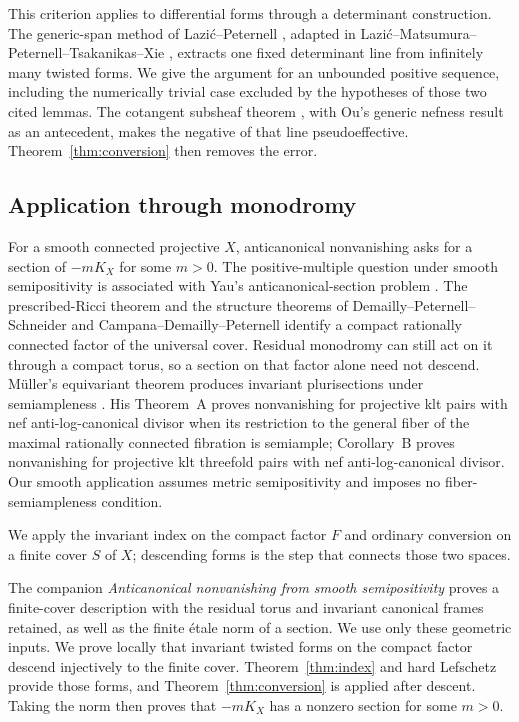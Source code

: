 This criterion applies to differential forms through a determinant
construction. The generic-span method of Lazi\'c--Peternell
\cite[Lemma~4.1]{LP2018}, adapted in
Lazi\'c--Matsumura--Peternell--Tsakanikas--Xie
\cite[Lemma~5.1]{LMPTX2023}, extracts one fixed determinant line
from infinitely many twisted forms. We give the argument for an
unbounded positive sequence, including the numerically trivial case
excluded by the hypotheses of those two cited lemmas. The cotangent
subsheaf theorem \cite[Theorem~4.1]{LMPTX2023}, with Ou's generic
nefness result \cite[Theorem~1.4]{Ou2023} as an antecedent, makes the
negative of that line pseudoeffective. Theorem~\ref{thm:conversion}
then removes the error.

\subsection{Application through monodromy}

For a smooth connected projective \(X\), anticanonical nonvanishing asks
for a section of \(-mK_X\) for some \(m>0\). The positive-multiple
question under smooth semipositivity is associated with Yau's
anticanonical-section problem \cite[Problem~75]{Yau1994}.
The prescribed-Ricci theorem \cite{Yau1978} and the structure theorems
of Demailly--Peternell--Schneider and Campana--Demailly--Peternell
\cite{DPS1996,CDP2015} identify a compact rationally connected factor
of the universal cover. Residual monodromy can still act on it through
a compact torus, so a section on that factor alone need not descend.
M\"uller's equivariant theorem produces invariant plurisections under
semiampleness \cite[Theorem~C]{Muller2025}.
His Theorem~A proves nonvanishing for projective klt pairs with nef
anti-log-canonical divisor when its restriction to the general fiber of
the maximal rationally connected fibration is semiample; Corollary~B
proves nonvanishing for projective klt threefold pairs with nef
anti-log-canonical divisor. Our smooth application assumes metric
semipositivity and imposes no fiber-semiampleness condition.

We apply the invariant index on the compact factor \(F\) and ordinary
conversion on a finite cover \(S\) of \(X\); descending forms is the
step that connects those two spaces.

The companion \emph{Anticanonical nonvanishing from smooth
semipositivity} \cite{CompanionH} proves a finite-cover description with the
residual torus and invariant canonical frames retained, as well as the
finite \'etale norm of a section. We use only these
geometric inputs. We prove locally that invariant twisted forms on the
compact factor descend injectively to the finite cover. Theorem~\ref{thm:index}
and hard Lefschetz provide those forms, and
Theorem~\ref{thm:conversion} is applied after descent. Taking the norm
then proves that \(-mK_X\) has a nonzero section for some \(m>0\).

